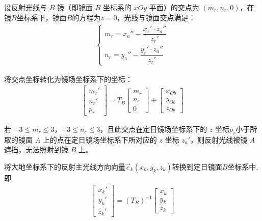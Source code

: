 \documentclass[../main.tex]{subfiles}
\begin{document}
\par 设反射光线与 $B$ 镜（即镜面 $B$ 坐标系的 $xOy$ 平面）的交点为 $(m_r, n_r, 0)$，在镜\( B \)坐标系下，镜面\( B \)的方程为\( z = 0 \)，光线与镜面交点满足：
\begin{align}\label{4.1}
  \begin{cases}
m_r = x_a'' - \dfrac{x_r' \cdot z_a''}{z_r'} \\
n_r = y_a'' - \dfrac{y_r' \cdot z_a''}{z_r'}
\end{cases}
\end{align}
\par 将交点坐标转化为镜场坐标系下的坐标：
\begin{align}\label{4.2}
\begin{bmatrix}
m_r' \\
n_r' \\
p_r
\end{bmatrix}
= T_B \begin{bmatrix}
m_r \\
n_r \\
0
\end{bmatrix}
+ \begin{bmatrix}
x_{Ob} \\
y_{Ob} \\
z_{Ob}
\end{bmatrix}
\end{align}
\par 若 $-3 \leq m_r \leq 3$，$-3 \leq n_r \leq 3$，且此交点在定日镜场坐标系下的 $z$ 坐标$p_r$小于所取的镜面 $A$ 上的点在定日镜场坐标系下所对应的 $z$ 坐标 $z_a'$，则反射光线被镜 \( A \) 遮挡，无法照射到镜 \( B \) 上。
\par 将大地坐标系下的反射主光线方向向量$\vec{e}_k (x_k, y_k, z_k)$转换到定日镜面$B$坐标系中,即
\begin{align}    \label{1.325}
\begin{bmatrix}
x_k' \\
y_k' \\
z_k'
\end{bmatrix}
= ({T_B})^{-1} \begin{bmatrix}
x_k \\
y_k \\
z_k
\end{bmatrix}
\end{align}
\end{document}
